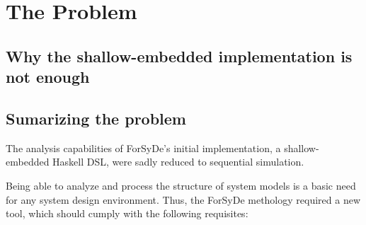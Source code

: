 \section{The Problem}
\subsection{Why the shallow-embedded implementation is not enough}


\subsection{Sumarizing the problem}

The analysis capabilities of ForSyDe's initial implementation, a
shallow-embedded Haskell DSL, were sadly reduced to sequential simulation.

Being able to analyze and process the structure of system models is a
basic need for any system design environment. Thus, the ForSyDe
methology required a new tool, which should cumply with the following
requisites:

